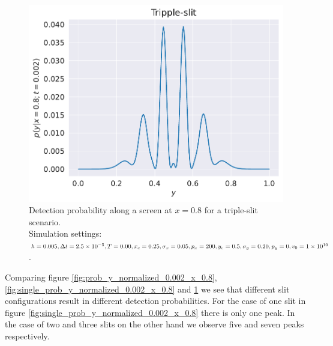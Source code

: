 \documentclass[english,notitlepage,reprint,nofootinbib]{revtex4-1}  %
\begin{document}
\begin{figure}[H]
    \centering
    \includegraphics[width=.5\textwidth]{../figures/tripple_prob_y_normalized_0.002_x_0.8.pdf}
    \caption{Detection probability along a screen at $x =0.8$ for a triple-slit scenario. \\Simulation settings: $h = 0.005, \Delta t = 2.5 \times 10^{-5}, \\T = 0.00, x_c = 0.25, \sigma_x = 0.05, p_x = 200, y_c = 0.5, \\\sigma_y = 0.20, p_y = 0, v_0 = 1 \times 10^{10}$.}
    \label{fig:tripple_prob_y_normalized_0.002_x_0.8}
\end{figure}
Comparing figure \ref{fig:prob_y_normalized_0.002_x_0.8}, \ref{fig:single_prob_y_normalized_0.002_x_0.8} and \ref{fig:tripple_prob_y_normalized_0.002_x_0.8} we see that different slit configurations result in different detection probabilities. For the case of one slit in figure \ref{fig:single_prob_y_normalized_0.002_x_0.8} there is only one peak. In the case of two and three slits on the other hand we observe five and seven peaks respectively.

\end{document}
